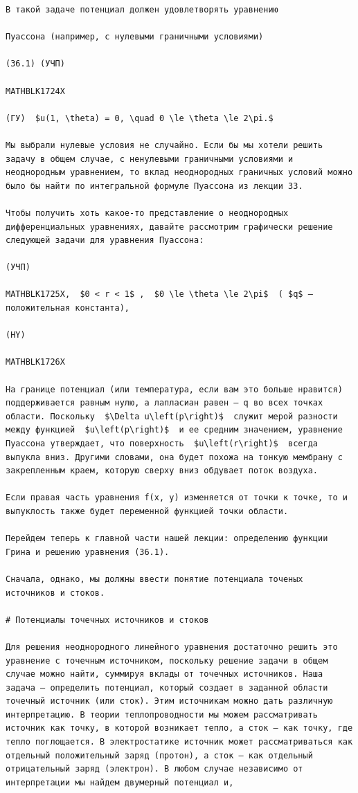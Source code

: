 \documentclass[
]{article}
\begin{document}
\begin{verbatim}
В такой задаче потенциал должен удовлетворять уравнению

Пуассона (например, с нулевыми граничными условиями)

(36.1) (УЧП) 

MATHBLK1724X

(ГУ)  $u(1, \theta) = 0, \quad 0 \le \theta \le 2\pi.$ 

Мы выбрали нулевые условия не случайно. Если бы мы хотели решить задачу в общем случае, с ненулевыми граничными условиями и неоднородным уравнением, то вклад неоднородных граничных условий можно было бы найти по интегральной формуле Пуассона из лекции 33.

Чтобы получить хоть какое-то представление о неоднородных дифференциальных уравнениях, давайте рассмотрим графически решение следующей задачи для уравнения Пуассона:

(УЧП) 

MATHBLK1725X,  $0 < r < 1$ ,  $0 \le \theta \le 2\pi$  ( $q$ —положительная константа),

(HY) 

MATHBLK1726X

На границе потенциал (или температура, если вам это больше нравится) поддерживается равным нулю, а лапласиан равен — q во всех точках области. Поскольку  $\Delta u\left(p\right)$  служит мерой разности между функцией  $u\left(p\right)$  и ее средним значением, уравнение Пуассона утверждает, что поверхность  $u\left(r\right)$  всегда выпукла вниз. Другими словами, она будет похожа на тонкую мембрану с закрепленным краем, которую сверху вниз обдувает поток воздуха.

Если правая часть уравнения f(x, y) изменяется от точки к точке, то и выпуклость также будет переменной функцией точки области.

Перейдем теперь к главной части нашей лекции: определению функции Грина и решению уравнения (36.1).

Сначала, однако, мы должны ввести понятие потенциала точеных источников и стоков.

# Потенциалы точечных источников и стоков

Для решения неоднородного линейного уравнения достаточно решить это уравнение с точечным источником, поскольку решение задачи в общем случае можно найти, суммируя вклады от точечных источников. Наша задача — определить потенциал, который создает в заданной области точечный источник (или сток). Этим источникам можно дать различную интерпретацию. В теории теплопроводности мы можем рассматривать источник как точку, в которой возникает тепло, а сток — как точку, где тепло поглощается. В электростатике источник может рассматриваться как отдельный положительный заряд (протон), а сток — как отдельный отрицательный заряд (электрон). В любом случае независимо от интерпретации мы найдем двумерный потенциал и,


\end{verbatim}
\end{document}
